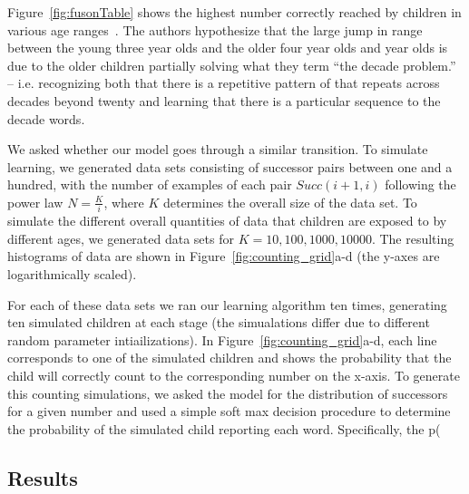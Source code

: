 \documentclass[10pt,letterpaper]{article}
\begin{document}
Figure~\ref{fig:fusonTable} shows the highest number correctly reached
by children in various age ranges~\cite{FusRicBriar1982}. The authors
hypothesize that the large jump in range between the young three year
olds and the older four year olds and year olds is due to the older
children partially solving what they term ``the decade problem.'' --
i.e. recognizing both that there is a repetitive pattern of that
repeats across decades beyond twenty and learning that there is a
particular sequence to the decade words.

We asked whether our model goes through a similar transition. To
simulate learning, we generated data sets consisting of successor
pairs between one and a hundred, with the number of examples of each
pair $Succ(i+1, i)$ following the power law $N=\frac{K}{i}$, where $K$
determines the overall size of the data set. To simulate the different
overall quantities of data that children are exposed to by different
ages, we generated data sets for $K=10, 100, 1000, 10000$. The
resulting histograms of data are shown in
Figure~\ref{fig:counting_grid}a-d (the y-axes are logarithmically
scaled). 

For each of these data sets we ran our learning algorithm ten times,
generating ten simulated children at each stage (the simualations
differ due to different random parameter intiailizations). In
Figure~\ref{fig:counting_grid}a-d, each line corresponds to one of the
simulated children and shows the probability that the child will
correctly count to the corresponding number on the x-axis. To generate
this counting simulations, we asked the model for the distribution of
successors for a given number and used a simple soft max decision procedure
to determine the probability of the simulated child reporting each
word. Specifically, the p(

 


\subsection{Results}
\end{document}

